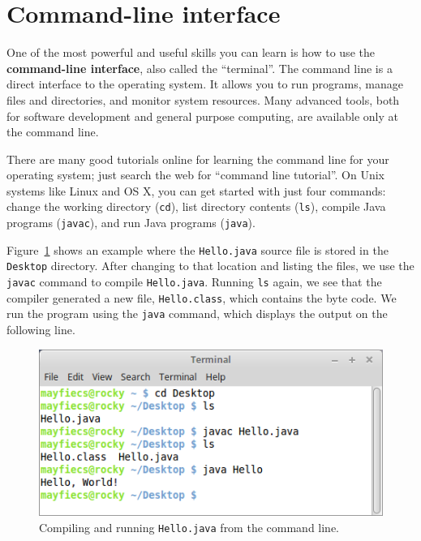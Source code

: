 \documentclass[12pt]{book}
\theoremstyle{exercise}
\begin{document}
\section{Command-line interface}
\label{commandline}


One of the most powerful and useful skills you can learn is how to use the {\bf command-line interface}, also called the ``terminal''.
The command line is a direct interface to the operating system.
It allows you to run programs, manage files and directories, and monitor system resources.
Many advanced tools, both for software development and general purpose computing, are available only at the command line.

There are many good tutorials online for learning the command line for your operating system; just search the web for ``command line tutorial''.
On Unix systems like Linux and OS X, you can get started with just four commands: change the working directory ({\tt cd}), list directory contents ({\tt ls}), compile Java programs ({\tt javac}), and run Java programs ({\tt java}).

Figure~\ref{fig.terminal} shows an example where the {\tt Hello.java} source file is stored in the {\tt Desktop} directory.
After changing to that location and listing the files, we use the {\tt javac} command to compile {\tt Hello.java}.
Running {\tt ls} again, we see that the compiler generated a new file, {\tt Hello.class}, which contains the byte code.
We run the program using the {\tt java} command, which displays the output on the following line.

\begin{figure}[!ht]
\begin{center}
\includegraphics[width=4.5in]{figs/terminal.png}
\caption{Compiling and running {\tt Hello.java} from the command line.}
\label{fig.terminal}
\end{center}
\end{figure}
\end{document}
